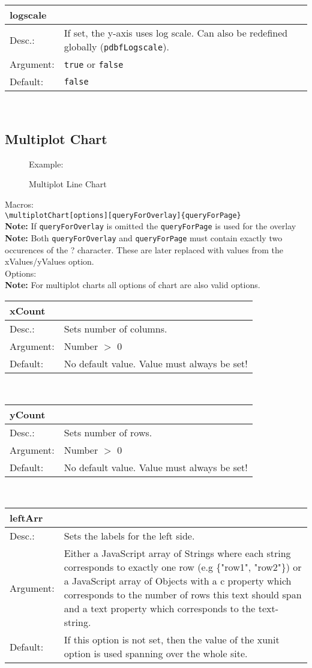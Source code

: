 \documentclass[11pt]{article}
\def\a{5cm}
\def\b{10.5cm}
\def\option#1#2#3#4{%
\noindent \begin{tabular}{|p{\a}|p{\b}|}
\hline
\textbf{#1} & \\
\hline
Desc.: & #2 \\
\hline
Argument: & #3\\
\hline
Default:& #4\\
\hline
\end{tabular} \\[4pt]%
}
\begin{document}
\option
{logscale}
{If set, the y-axis uses log scale. Can also be redefined globally (\texttt{pdbfLogscale}).}
{\texttt{true} or \texttt{false}}
{\texttt{false}}

%
%

\subsection{Multiplot Chart}
\begin{figure}[h!]%
    Example:\\
    \caption{Multiplot Line Chart}
\end{figure}

\noindent Macros: \\[3pt]
\verb|\multiplotChart[options][queryForOverlay]{queryForPage}| \\
\textbf{Note:} If \verb|queryForOverlay| is omitted the \verb|queryForPage| is used for the overlay\\
\textbf{Note:} Both \verb|queryForOverlay| and \verb|queryForPage| must contain exactly two occurences of the ? character. These are later replaced with values from the xValues/yValues option.\\[8pt]
\noindent Options: \\[3pt]
%
\textbf{Note:} For multiplot charts all options of chart are also valid options.\\[4pt]
%
\option
{xCount}
{Sets number of columns.}
{Number $>$ 0}
{No default value. Value must always be set!}

\option
{yCount}
{Sets number of rows.}
{Number $>$ 0}
{No default value. Value must always be set!}

\option
{leftArr}
{Sets the labels for the left side.}
{Either a JavaScript array of Strings where each string corresponds to exactly one row (e.g \{"row1", "row2"\}) or a JavaScript array of Objects with a c property which corresponds to the number of rows this text should span and a text property which corresponds to the text-string.}
{If this option is not set, then the value of the xunit option is used spanning over the whole site.}
\end{document}
